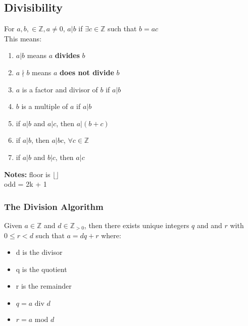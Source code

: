 \documentclass[letter]{article}
\begin{document}
\begin{multicols}{2}
  \subsection{Divisibility} 
  For $a, b, \in \mathbb{Z}, a \neq 0$, $a|b$ if $\exists c \in \mathbb{Z}$ such
  that $b = ac$\\
  This means:
  \begin{enumerate} 
      \item $a|b$ means $a$ \textbf{divides} $b$
      \item $a \nmid b$ means $a$ \textbf{does not divide} $b$
      \item $a$ is a factor and divisor of $b$ if $a|b$
      \item $b$ is a multiple of $a$ if $a|b$
	\item if $a|b$ and $a|c$, then $a|(b+c)$
	\item if $a|b$, then $a|bc$, $\forall c \in \mathbb{Z}$
	\item if $a|b$ and $b|c$, then $a|c$
  \end{enumerate}
  \textbf{Notes:} floor is $\lfloor \rfloor$\\
  odd = 2k + 1

  \subsubsection{The Division Algorithm} 
  Given $a \in \mathbb{Z}$ and $d \in \mathbb{Z}_{>0}$, then there exists unique
  integers $q$ and and $r$ with $0 \leq r < d$ such that $a = dq + r$ where:
  \begin{itemize} 
	  \item d is the divisor
	  \item q is the quotient
	  \item r is the remainder
	  \item $q = a \text{ div } d$
	  \item $r = a \text{ mod } d$
  \end{itemize}


\end{multicols}
\end{document}
